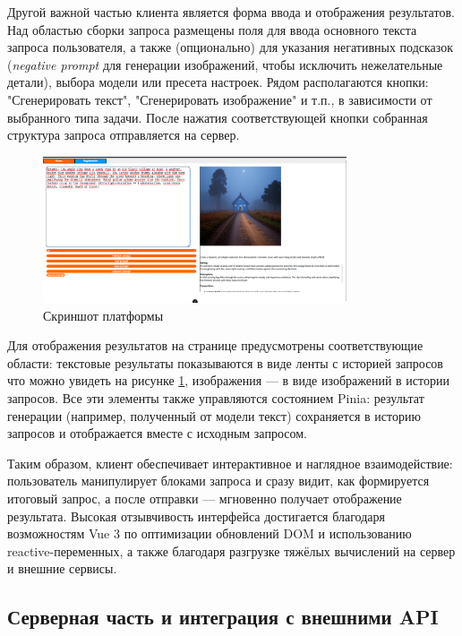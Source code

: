 Другой важной частью клиента является форма ввода и отображения результатов. Над областью сборки запроса размещены поля для ввода основного текста запроса пользователя, а также (опционально) для указания негативных подсказок (\textit{negative prompt} для генерации изображений, чтобы исключить нежелательные детали), выбора модели или пресета настроек. Рядом располагаются кнопки: "Сгенерировать текст", "Сгенерировать изображение" и т.п., в зависимости от выбранного типа задачи. После нажатия соответствующей кнопки собранная структура запроса отправляется на сервер.
\begin{figure}[h]
    \centering
    \includegraphics[width=0.8\textwidth]{picture/interface-screenshot_1.png}
    \caption{Скриншот платформы}\label{interface-screenshot}
\end{figure}
Для отображения результатов на странице предусмотрены соответствующие области: текстовые результаты показываются в виде ленты с историей запросов что можно увидеть на рисунке \ref{interface-screenshot}, изображения — в виде изображений в истории запросов. Все эти элементы также управляются состоянием Pinia: результат генерации (например, полученный от модели текст) сохраняется в историю запросов и отображается вместе с исходным запросом.

Таким образом, клиент обеспечивает интерактивное и наглядное взаимодействие: пользователь манипулирует блоками запроса и сразу видит, как формируется итоговый запрос, а после отправки — мгновенно получает отображение результата. Высокая отзывчивость интерфейса достигается благодаря возможностям Vue 3 по оптимизации обновлений DOM и использованию reactive-переменных, а также благодаря разгрузке тяжёлых вычислений на сервер и внешние сервисы.

\subsection{Серверная часть и интеграция с внешними API}

